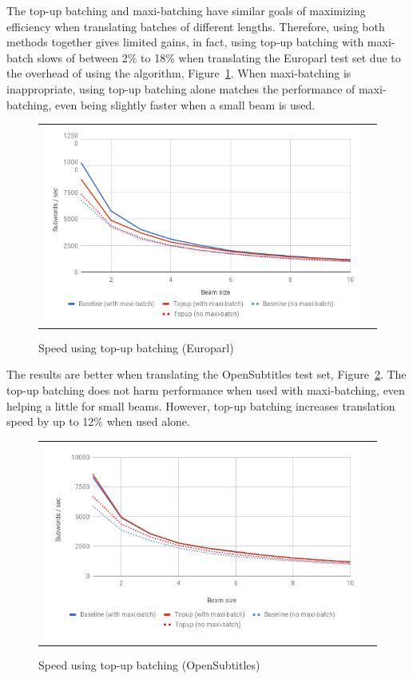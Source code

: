 \documentclass[11pt,a4paper]{article}
\begin{document}
The top-up batching and maxi-batching have similar goals of maximizing efficiency when translating batches of different lengths. Therefore, using both methods together gives limited gains, in fact, using top-up batching with maxi-batch slows of between 2\% to 18\% when translating the Europarl test set due to the overhead of using the algorithm, Figure~\ref{fig:topup-europarl}. When maxi-batching is inappropriate, using top-up batching alone matches the performance of maxi-batching, even being slightly faster when a small beam is used.

\begin{figure}
\centering
\begin{tabular}{cc}
{\includegraphics[scale=0.3]{topup-europarl.png}} 
\end{tabular}
\caption{Speed using top-up batching (Europarl)}
\label{fig:topup-europarl}
\end{figure} 

The results are better when translating the OpenSubtitles test set, Figure~\ref{fig:topup-opensubtitles}. The top-up batching does not harm performance when used with maxi-batching, even helping a little for small beams. However, top-up batching increases translation speed by up to 12\% when used alone.

\begin{figure}
\centering
\begin{tabular}{cc}
{\includegraphics[scale=0.3]{topup-opensubtitles.png}} 
\end{tabular}
\caption{Speed using top-up batching (OpenSubtitles)}
\label{fig:topup-opensubtitles}
\end{figure} 
\end{document}
